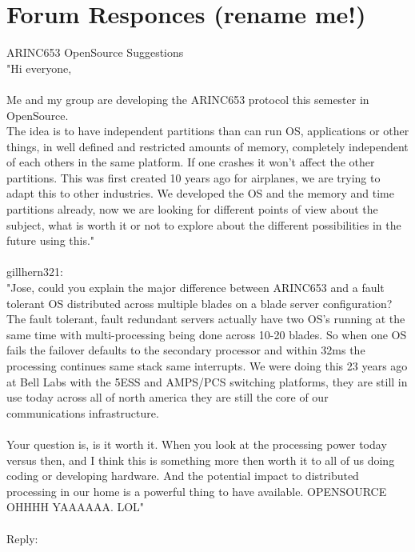 \chapter{Forum Responces (rename me!)}

ARINC653 OpenSource Suggestions\\

"Hi everyone,\\
\\

Me and my group are developing the ARINC653 protocol this semester in OpenSource.\\
The idea is to have independent partitions than can run OS, applications or other things, in well defined
and restricted amounts of memory, completely independent of each others in the same platform. If one
crashes it won't affect the other partitions. This was first created 10 years ago for airplanes, we are
trying to adapt this to other industries. We developed the OS and the memory and time partitions already,
now we are looking for different points of view about the subject, what is worth it or not to explore 
about the different possibilities in the future using this."\\
\\
gillhern321:\\

"Jose, could you explain the major difference between ARINC653 and a fault tolerant OS distributed across 
multiple blades on a blade server configuration? The fault tolerant, fault redundant servers actually have 
two OS's running at the same time with multi-processing being done across 10-20 blades. So when one OS 
fails the failover defaults to the secondary processor and within 32ms the processing continues same stack 
same interrupts. We were doing this 23 years ago at Bell Labs with the 5ESS and AMPS/PCS switching 
platforms, they are still in use today across all of north america they are still the core of our 
communications infrastructure.\\
\\

Your question is, is it worth it. When you look at the processing power today versus then,  and I think 
this is something more then worth it to all of us doing coding or developing hardware. And the potential 
impact to distributed processing in our home is a powerful thing to have available.  OPENSOURCE     OHHHH 
YAAAAAA. LOL"\\
\\
Reply:\\

